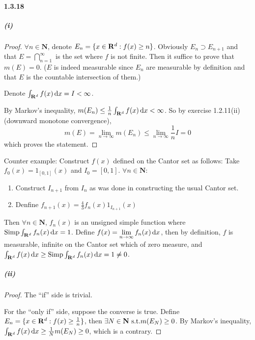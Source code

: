 \documentclass{article}
\begin{document}
\paragraph{1.3.18}
\subparagraph{(i)}
\begin{proof}
$\forall n\in\mathbf{N}$, denote $E_n=\{x\in\mathbf{R}^d:f(x)\geq n\}$. Obviously $E_n\supset E_{n+1}$ and that $E=\bigcap_{n=1}^{\infty}$ is the set where $f$ is not finite. Then it suffice to prove that $m(E)=0$. ($E$ is indeed measurable since $E_n$ are measurable by definition and that $E$ is the countable intersection of them.) 

Denote $\int_{\mathbf{R}^d} f(x)\,\mathrm{d} x =I<\infty$.

By Markov's inequality, $m(E_n)\leq \frac{1}{n} \int_{\mathbf{R}^d} f(x)\,\mathrm{d} x <\infty$. So by exercise 1.2.11(ii) (downward monotone convergence), 
\[m(E)=\lim\limits_{n\to\infty}m(E_n)\leq\lim\limits_{n\to\infty}\frac 1 n I=0\]
which proves the statement.
\end{proof}
Counter example: Construct $f(x)$ defined on the Cantor set as follows: Take $f_0(x)=1_{[0,1]}(x)$ and $I_0=[0,1]$. $\forall n\in\mathbf{N}$:
\begin{enumerate}
\item{} Construct $I_{n+1}$ from $I_{n}$ as was done in constructing the usual Cantor set.
\item{} Denfine $f_{n+1}(x)=\frac 4 3 f_n(x)1_{I_{n+1}}(x)$
\end{enumerate}
Then $\forall n\in \mathbf{N}$, $f_n(x)$ is an unsigned simple function where $\mathrm{Simp}\int_{\mathbf{R}^d} f_n(x)\,\mathrm{d} x=1$. Define $f(x)=\lim\limits_{n\to\infty}f_n(x)\,\mathrm{d} x$, then by definition, $f$ is measurable, infinite on the Cantor set which of zero measure, and $\int_{\mathbf{R}^d} f(x)\,\mathrm{d} x\geq \mathrm{Simp}\int_{\mathbf{R}^d} f_n(x)\,\mathrm{d} x=1\neq 0$.

\subparagraph{(ii)}
\begin{proof}
The ``if'' side is trivial. 

For the ``only if'' side, suppose the converse is true. Define $E_n=\{x\in\mathbf{R}^d:f(x)\geq \frac 1 n\}$, then $\exists N\in\mathbf{N}\text{ s.t.} m(E_N)\geq 0$. By Markov's inequality, $\int_{\mathbf{R}^d} f(x)\,\mathrm{d} x\geq \frac 1 N m(E_N)\geq 0$, which is a contrary.
\end{proof}
\end{document}
